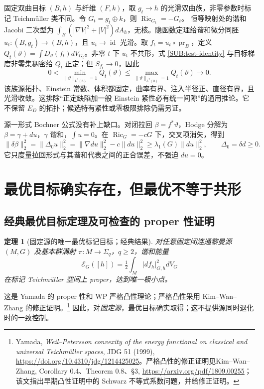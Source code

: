\documentclass[UTF8,fontset=fandol,zihao=-4,oneside,openany]{ctexbook}
\theoremstyle{cjkplain}
\newtheorem{theorem}{定理}[chapter]
\numberwithin{equation}{chapter}
\begin{document}
固定双曲目标 $(B,h)$ 与纤维 $(F,k)$，取 $g_t\to h$ 的光滑双曲族，非零参数时标记 Teichmüller 类不同。令
$G_t=g_t\oplus k$，则 $\operatorname{Ric}_{G_t}=-G_t$。
恒等映射处的谐和 Jacobi 二次型为
$\int_B(|\nabla V|^2+|V|^2)dA_h$，无核。隐函数定理给谐和微分同胚
$u_t:(B,g_t)\to(B,h)$，且 $u_t\to\operatorname{id}$ 光滑。取
$f_t=u_t\circ\operatorname{pr}_B$，定义
$Q_t(\vartheta)=\int D_\vartheta(f_t)dV_{G_t}$。非零 $t$ 下 $u_t$ 不共形，式 \eqref{SUB:test-identity} 与目标梯度非零集稠密给 $Q_t$ 正定；但 $S_{f_t}\to0$，因此
\begin{equation}\label{SUB:no-uniform-test-gap}
0<\min_{\|\vartheta\|_{L^2(h)}=1}Q_t(\vartheta)
\le\max_{\|\vartheta\|_{L^2(h)}=1}Q_t(\vartheta)\longrightarrow0.
\end{equation}
该族源拓扑、Einstein 常数、体积都固定，曲率有界、注入半径正、直径有界，且光滑收敛。这排除“正定缺陷加一般 Einstein 紧性必有统一间隙”的通用推论。它不保留 $E_D$ 的拓扑；候选特有紧性或零极限排除仍需另证。

源一形式 Bochner 公式没有补上缺口。对闭拉回 $\beta=f^*\vartheta$，Hodge 分解为 $\beta=\gamma+du$，$\gamma$ 谐和，$\int u=0$。在 $\operatorname{Ric}_G=-cG$ 下，交叉项消失，得到
\begin{equation}\label{SUB:one-form-bochner-split}
\|\delta\beta\|_2^2=\|\Delta_0u\|_2^2
=\|\nabla du\|_2^2-c\|du\|_2^2
\ge\lambda_1(G)\|du\|_2^2,\qquad\Delta_0=\delta d\ge0.
\end{equation}
它只度量拉回形式与其谐和代表之间的正合误差，不强迫 $du=0$。

\section{最优目标确实存在，但最优不等于共形}

\subsection{经典最优目标定理及可检查的 proper 性证明}

\begin{theorem}[固定源的唯一最优标记目标；经典结果]\label{SUB:optimal-target}
对任意固定闭连通黎曼源 $(M,G)$ 及基本群满射
$\pi:M\to\Sigma_q$，$q\ge2$，谐和能量
\[
\mathcal E_G([h])=\tfrac12\int_M|df_h|_{G,h}^2dV_G
\]
在标记 Teichmüller 空间上 proper，达到唯一极小点。
\end{theorem}

这是 Yamada 的 proper 性和 WP 严格凸性理论；严格凸性采用 Kim--Wan--Zhang 的修正证明。\footnote{Yamada, \emph{Weil--Petersson convexity of the energy functional on classical and universal Teichmüller spaces}, JDG 51 (1999), \url{https://doi.org/10.4310/jdg/1214425025}。严格凸性的修正证明见Kim--Wan--Zhang, Corollary 0.4、Theorem 0.8、§3, \url{https://arxiv.org/pdf/1809.00255}；该文指出早期凸性证明中的 Schwarz 不等式系数问题，并给修正证明。}
因此，对\emph{固定源}，最优目标确实取得；这不提供源同时退化时的一致控制。
\end{document}
